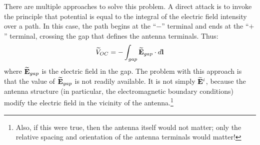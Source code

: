 There are multiple approaches to solve this problem.
A direct attack is to invoke the principle that potential is equal to the integral of the electric field intensity over a path.
In this case, the path begins at the ``$-$'' terminal and ends at the ``$+$'' terminal, crossing the gap that defines the antenna terminals.
Thus:
%
\begin{equation}
\widetilde{V}_{OC} = -\int_{gap} \widetilde{\bf E}_{gap} \cdot d{\bf l}
\label{m0215_eVoc-General}
\end{equation}
%
where $\widetilde{\bf E}_{gap}$ is the electric field in the gap.
The problem with this approach is that the value of $\widetilde{\bf E}_{gap}$ is not readily available.
It is not simply $\widetilde{\bf E}^i$, because the antenna structure (in particular, the electromagnetic boundary conditions)
modify the electric field in the vicinity of the antenna.\footnote{Also, if this were true, then the antenna itself would not matter; only the relative spacing and orientation of the antenna terminals would matter!}

